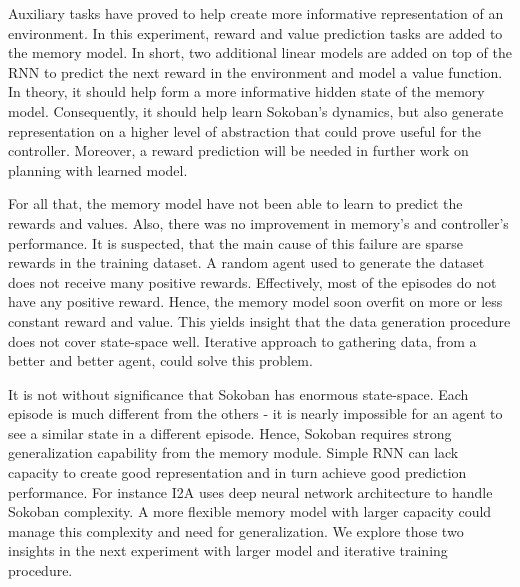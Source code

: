 Auxiliary tasks\cite{Algo.AuxiliaryTasks} have proved to help create more informative representation of an environment. In this experiment, reward and value prediction tasks are added to the memory model. In short, two additional linear models are added on top of the RNN to predict the next reward in the environment and model a value function. In theory, it should help form a more informative hidden state of the memory model. Consequently, it should help learn Sokoban’s dynamics, but also generate representation on a higher level of abstraction that could prove useful for the controller. Moreover, a reward prediction will be needed in further work on planning with learned model.

For all that, the memory model have not been able to learn to predict the rewards and values. Also, there was no improvement in memory's and controller’s performance. It is suspected, that the main cause of this failure are sparse rewards in the training dataset. A random agent used to generate the dataset does not receive many positive rewards. Effectively, most of the episodes do not have any positive reward. Hence, the memory model soon overfit on more or less constant reward and value. 
This yields insight that the data generation procedure does not cover state-space well. Iterative approach to gathering data, from a better and better agent, could solve this problem.

It is not without significance that Sokoban has enormous state-space. Each episode is much different from the others - it is nearly impossible for an agent to see a similar state in a different episode. Hence, Sokoban requires strong generalization capability from the memory module. Simple RNN can lack capacity to create good representation and in turn achieve good prediction performance. For instance I2A\cite{Algo.I2A} uses deep neural network architecture to handle Sokoban complexity. A more flexible memory model with larger capacity could manage this complexity and need for generalization. We explore those two insights in the next experiment with larger model and iterative training procedure.
